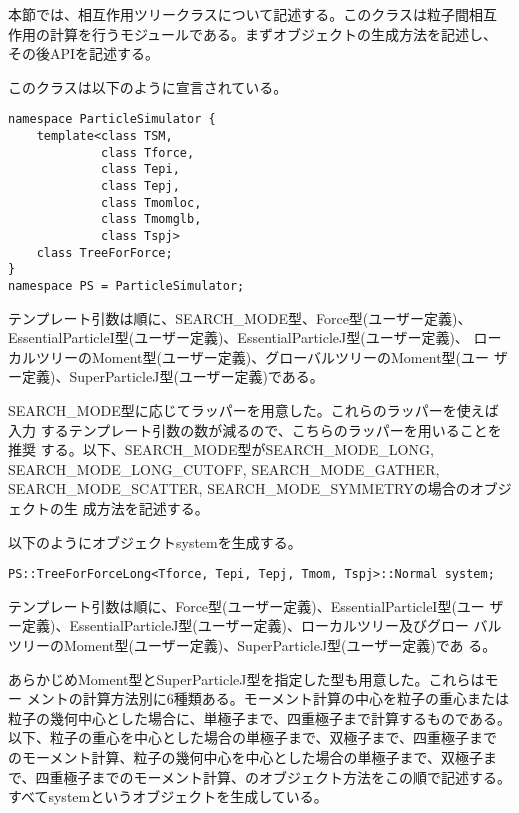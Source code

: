 本節では、相互作用ツリークラスについて記述する。このクラスは粒子間相互
作用の計算を行うモジュールである。まずオブジェクトの生成方法を記述し、
その後APIを記述する。


このクラスは以下のように宣言されている。
\begin{lstlisting}[caption=TreeForForce0]
namespace ParticleSimulator {
    template<class TSM,
             class Tforce,
             class Tepi,
             class Tepj,
             class Tmomloc,
             class Tmomglb,
             class Tspj>
    class TreeForForce;
}
namespace PS = ParticleSimulator;
\end{lstlisting}

テンプレート引数は順に、SEARCH\_MODE型、Force型(ユーザー定義)、
EssentialParticleI型(ユーザー定義)、EssentialParticleJ型(ユーザー定義)、
ローカルツリーのMoment型(ユーザー定義)、グローバルツリーのMoment型(ユー
ザー定義)、SuperParticleJ型(ユーザー定義)である。

SEARCH\_MODE型に応じてラッパーを用意した。これらのラッパーを使えば入力
するテンプレート引数の数が減るので、こちらのラッパーを用いることを推奨
する。以下、SEARCH\_MODE型がSEARCH\_MODE\_LONG,
SEARCH\_MODE\_LONG\_CUTOFF, SEARCH\_MODE\_GATHER,
SEARCH\_MODE\_SCATTER, SEARCH\_MODE\_SYMMETRYの場合のオブジェクトの生
成方法を記述する。


以下のようにオブジェクトsystemを生成する。
\begin{screen}
\begin{verbatim}
PS::TreeForForceLong<Tforce, Tepi, Tepj, Tmom, Tspj>::Normal system;
\end{verbatim}
\end{screen}
テンプレート引数は順に、Force型(ユーザー定義)、EssentialParticleI型(ユー
ザー定義)、EssentialParticleJ型(ユーザー定義)、ローカルツリー及びグロー
バルツリーのMoment型(ユーザー定義)、SuperParticleJ型(ユーザー定義)であ
る。

あらかじめMoment型とSuperParticleJ型を指定した型も用意した。これらはモー
メントの計算方法別に6種類ある。モーメント計算の中心を粒子の重心または
粒子の幾何中心とした場合に、単極子まで、四重極子まで計算するものである。
以下、粒子の重心を中心とした場合の単極子まで、双極子まで、四重極子まで
のモーメント計算、粒子の幾何中心を中心とした場合の単極子まで、双極子ま
で、四重極子までのモーメント計算、のオブジェクト方法をこの順で記述する。
すべてsystemというオブジェクトを生成している。

